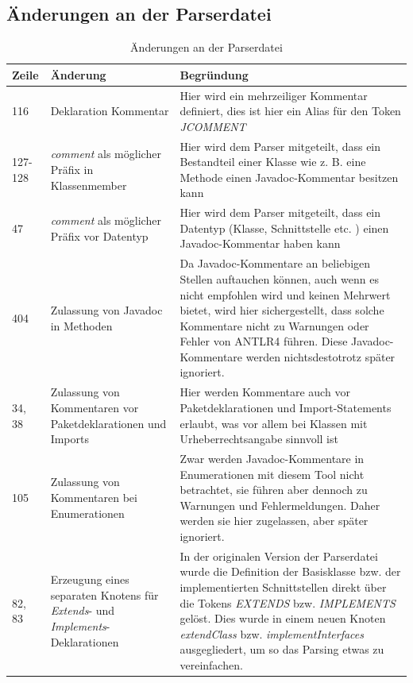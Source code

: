 
\renewcommand\appendixpagename{Anhänge}
\begin{appendices}


\chapter{Änderungen an der Parserdatei}
\begin{table}[h!]
    \centering
    \begin{tabular}{m{0.75cm}|m{4cm}|m{10cm}}
        Zeile & Änderung & Begründung \\
         \hline
        116 & Deklaration Kommentar & Hier wird ein mehrzeiliger Kommentar definiert, dies ist hier ein Alias für den Token \textit{JCOMMENT}\\
        \hline
        127-128 & \textit{comment} als möglicher Präfix in Klassenmember & Hier wird dem Parser mitgeteilt, dass ein Bestandteil einer Klasse wie z. B. eine Methode einen Javadoc-Kommentar besitzen kann\\
        \hline
        47 & \textit{comment} als möglicher Präfix vor Datentyp & Hier wird dem Parser mitgeteilt, dass ein Datentyp (Klasse, Schnittstelle etc. ) einen Javadoc-Kommentar haben kann \\
        \hline
        404 & Zulassung von Javadoc in Methoden & Da Javadoc-Kommentare an beliebigen Stellen auftauchen können, auch wenn es nicht empfohlen wird und keinen Mehrwert bietet, wird hier sichergestellt, dass solche Kommentare nicht zu Warnungen oder Fehler von ANTLR4 führen. Diese Javadoc-Kommentare werden nichtsdestotrotz später ignoriert.\\
        \hline
        34, 38& Zulassung von Kommentaren vor Paketdeklarationen und Imports & Hier werden Kommentare auch vor Paketdeklarationen und Import-Statements erlaubt, was vor allem bei Klassen mit Urheberrechtsangabe sinnvoll ist\\
        \hline
        105 & Zulassung von Kommentaren bei Enumerationen & Zwar werden Javadoc-Kommentare in Enumerationen mit diesem Tool nicht betrachtet, sie führen aber dennoch zu Warnungen und Fehlermeldungen. Daher werden sie hier zugelassen, aber später ignoriert. \\
        \hline
        82, 83 & Erzeugung eines separaten Knotens für \textit{Extends}- und \textit{Implements}-Deklarationen & In der originalen Version der Parserdatei wurde die Definition der Basisklasse bzw. der implementierten Schnittstellen direkt über die Tokens \textit{EXTENDS} bzw. \textit{IMPLEMENTS} gelöst. Dies wurde in einem neuen Knoten \textit{extendClass} bzw. \textit{implementInterfaces} ausgegliedert, um so das Parsing etwas zu vereinfachen.  \\
         \hline
    \end{tabular}
    \caption{Änderungen an der Parserdatei}
    \label{tab:parser_changes}
\end{table}


\end{appendices}
